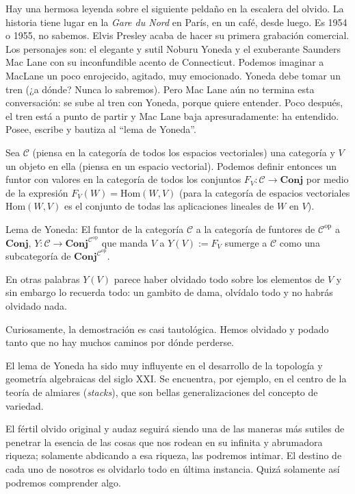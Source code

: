 \documentclass[12pt,a4paper, spanish]{amsart}
\numberwithin{equation}{section}
\theoremstyle{plain}
\theoremstyle{definition}
\begin{document}
Hay una hermosa leyenda sobre el siguiente peldaño en la escalera del olvido. La historia tiene lugar en la \emph{Gare du Nord} en París, en un café, desde luego. Es 1954 o 1955, no sabemos. Elvis Presley acaba de hacer su primera grabación comercial. Los personajes son: el elegante y sutil Noburu Yoneda y el exuberante Saunders Mac Lane con su inconfundible acento de Connecticut. Podemos imaginar a MacLane un poco enrojecido, agitado, muy emocionado. Yoneda debe tomar un tren (¿a dónde? Nunca lo sabremos). Pero Mac Lane aún no termina esta conversación: se sube al tren con Yoneda, porque quiere entender. Poco después, el tren está a punto de partir y Mac Lane baja apresuradamente: ha entendido. Posee, escribe y bautiza al ``lema de Yoneda''.

Sea $\mathcal{C}$ (piensa en la categoría de todos los espacios vectoriales) una categoría y $V$ un objeto en ella (piensa en un espacio vectorial). Podemos definir entonces un funtor con valores en la categoría de todos los conjuntos $F_V\colon \mathcal{C} \to \mathbf{Conj}$ por medio de la expresión $F_V(W) = \mathrm{Hom}(W,V)$ (para la categoría de espacios vectoriales $\mathrm{Hom}(W,V)$ es el conjunto de todas las aplicaciones lineales de $W$ en $V$). 

Lema de Yoneda: El funtor de la categoría $\mathcal{C}$ a la categoría de funtores de $\mathcal{C}^\mathrm{op}$ a $\mathbf{Conj}$, $Y:\mathcal{C} \to \mathbf{Conj}^{\mathcal{C}^\mathrm{op}}$ que manda $V$ a $Y(V):=F_V$ sumerge a $\mathcal{C}$ como una subcategoría de $\mathbf{Conj}^{\mathcal{C}^\mathrm{op}}$.



En otras palabras $Y(V)$ parece haber olvidado todo sobre los elementos de $V$ y sin embargo lo recuerda todo: un gambito de dama, olvídalo todo y no habrás olvidado nada.

Curiosamente, la demostración es casi tautológica. Hemos olvidado y podado tanto que no hay muchos caminos por dónde perderse.

El lema de Yoneda ha sido muy influyente en el desarrollo de la topología y geometría algebraicas del siglo XXI. Se encuentra, por ejemplo, en el centro de la teoría de almiares (\emph{stacks}), que son bellas generalizaciones del concepto de variedad.

El fértil olvido original y audaz seguirá siendo una de las maneras más sutiles de penetrar la esencia de las cosas que nos rodean en su infinita y abrumadora riqueza; solamente abdicando a esa riqueza, las podremos intimar. El destino de cada uno de nosotros es olvidarlo todo en última instancia. Quizá solamente así podremos comprender algo.












\end{document}
